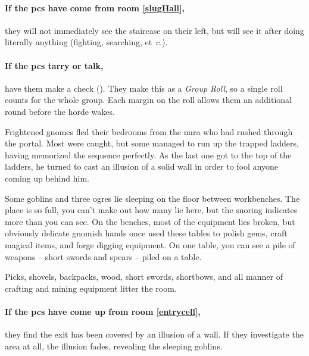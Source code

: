 \begin{multicols}{2}
\paragraph{If the \glspl{pc} have come from room \ref{slugHall},}
they will not immediately see the staircase on their left, but will see it after doing literally anything (fighting, searching, et~c.).

\paragraph{If the \glspl{pc} tarry or talk,}
have them make a  check (\tn[6]).
They make this as a \textit{Group Roll}, so a single roll counts for the whole group.
Each margin on the roll allows them an additional round before the horde wakes.


\label{laddertop}

\begin{exampletext}

  Frightened gnomes fled their bedrooms from the nura who had rushed through the portal.
  Most were caught, but some managed to run up the trapped ladders, having memorized the sequence perfectly.
  As the last one got to the top of the ladders, he turned to cast an illusion of a solid wall in order to fool anyone coming up behind him.

\end{exampletext}

\begin{boxtext}

  Some goblins and three ogres lie sleeping on the floor between workbenches.
  The place is so full, you can't make out how many lie here, but the snoring indicates more than you can see.
  On the benches, most of the equipment lies broken, but obviously delicate gnomish hands once used these tables to polish gems, craft magical items, and forge digging equipment.
  On one table, you can see a pile of weapons -- short swords and spears -- piled on a table.

\end{boxtext}

Picks, shovels, backpacks, wood, short swords, shortbows, and all manner of crafting and mining equipment litter the room.

\paragraph{If the \glspl{pc} have come up from room \ref{entrycell},}
they find the exit has been covered by an illusion of a wall.
If they investigate the area at all, the illusion fades, revealing the sleeping goblins.


\end{multicols}
